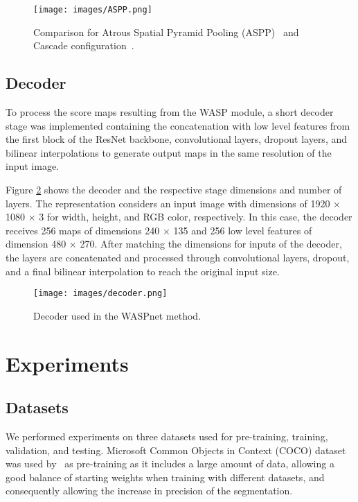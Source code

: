 \documentclass[sensors,article,accept,moreauthors,pdftex]{Definitions/mdpi}
\begin{document}
\begin{figure}[H]
\centering
\texttt{[image: images/ASPP.png]}
\caption{Comparison for Atrous Spatial Pyramid Pooling (ASPP)~\cite{DeepLab} and Cascade configuration~\cite{Rethinking}.}
\label{fig:ASPP}
\end{figure}

\subsection{Decoder}
To process the score maps resulting from the WASP module, a short decoder stage was implemented containing the concatenation with low level features from the first block of the ResNet backbone, convolutional layers, dropout layers, and bilinear interpolations to generate output maps in the same resolution of the input image.

Figure \ref{fig:decoder} shows the decoder and the respective stage dimensions and number of layers. The representation considers an input image with dimensions of 1920 $\times$ 1080 $\times$ 3 for width, height, and RGB color, respectively. In this case, the decoder receives 256 maps of dimensions 240 $\times$ 135 and 256 low level features of dimension 480 $\times$ 270. After matching the dimensions for inputs of the decoder, the layers are concatenated and processed through convolutional layers, dropout, and a final bilinear interpolation to reach the original input size.


\begin{figure}[H]
\centering
\texttt{[image: images/decoder.png]}
\caption{Decoder used in the WASPnet method.}
\label{fig:decoder}
\end{figure}

\section{Experiments}
\vspace{-6pt}

\subsection{Datasets}
We performed experiments on three datasets used for pre-training, training, validation, and testing.
Microsoft Common Objects in Context (COCO) dataset~\cite{COCO} was used by~\cite{DeepLab} as pre-training as it includes a large amount of data, allowing a good balance of starting weights when training with different datasets, and consequently allowing the increase in precision of the segmentation.
\end{document}
